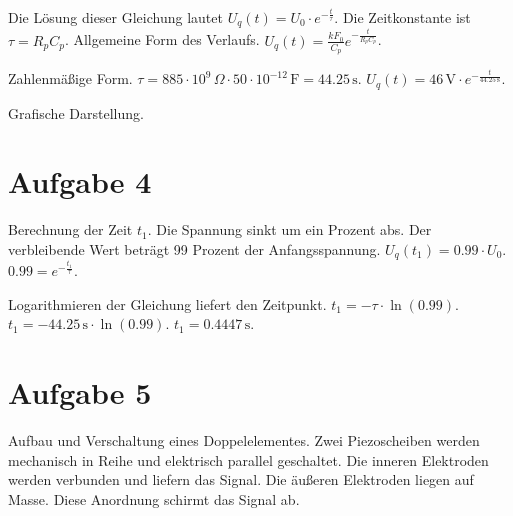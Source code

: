 \documentclass[11pt,a4paper]{article}
\begin{document}
Die Lösung dieser Gleichung lautet $U_q(t) = U_0 \cdot e^{-\frac{t}{\tau}}$.
Die Zeitkonstante ist $\tau = R_p C_p$.
Allgemeine Form des Verlaufs.
$U_q(t) = \frac{k F_0}{C_p} e^{-\frac{t}{R_p C_p}}$.

Zahlenmäßige Form.
$\tau = 885 \cdot 10^9 \, \Omega \cdot 50 \cdot 10^{-12} \, \text{F} = 44.25 \, \text{s}$.
$U_q(t) = 46 \, \text{V} \cdot e^{-\frac{t}{44.25 \, \text{s}}}$.

Grafische Darstellung.
\begin{center}
\end{center}

\section*{Aufgabe 4}
Berechnung der Zeit $t_1$.
Die Spannung sinkt um ein Prozent abs. Der verbleibende Wert beträgt 99 Prozent der Anfangsspannung.
$U_q(t_1) = 0.99 \cdot U_0$.
$0.99 = e^{-\frac{t_1}{\tau}}$.

Logarithmieren der Gleichung liefert den Zeitpunkt.
$t_1 = -\tau \cdot \ln(0.99)$.
$t_1 = -44.25 \, \text{s} \cdot \ln(0.99)$.
$t_1 = 0.4447 \, \text{s}$.

\section*{Aufgabe 5}
Aufbau und Verschaltung eines Doppelelementes.
Zwei Piezoscheiben werden mechanisch in Reihe und elektrisch parallel geschaltet. Die inneren Elektroden werden verbunden und liefern das Signal. Die äußeren Elektroden liegen auf Masse. Diese Anordnung schirmt das Signal ab.

\begin{center}
\end{center}
\end{document}
